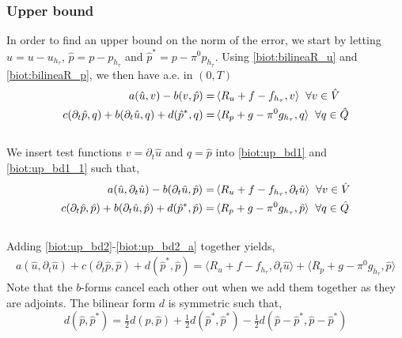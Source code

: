 \subsubsection{Upper bound} \label{biot_proof_struc}
In order to find an upper bound on the norm of the error, we start by letting $\hat{u}=u-u_{h_\tau}$, $\hat{p}=p-p_{h_\tau}$ and $\hat{p}^*=p-\pi^0p_{h_\tau}$. Using \eqref{biot:bilineaR_u} and \eqref{biot:bilineaR_p}, we then have a.e. in $(0,T)$ 
\\
\begin{align}
a(\hat{u}, v) - b(v, \hat{p}) = & \, \langle R_u + f - f_{h_\tau}, v \rangle \hspace{0.2cm} \forall v \in \hat{V} \label{biot:up_bd1}\\
c(\partial_t \hat{p}, q) + b(\partial_t \hat{u}, q) + d(\hat{p}^*, q) = & \, \langle R_p + g - \pi^0g_{h_\tau}, q \rangle \hspace{0.2cm} \forall q \in \hat{Q} \label{biot:up_bd1_1}
\end{align}
\\
We insert test functions $v=\partial_t \hat{u}$ and $q=\hat{p}$ into \eqref{biot:up_bd1} and \eqref{biot:up_bd1_1} such that,
\begin{align} \label{biot:up_bd2}
a(\hat{u}, \partial_t \hat{u}) - b(\partial_t \hat{u}, \hat{p}) = & \, \langle R_u + f - f_{h_\tau}, \partial_t \hat{u} \rangle \hspace{0.2cm} \forall v \in \hat{V} \\ \label{biot:up_bd2_a}
c(\partial_t \hat{p}, \hat{p}) + b(\partial_t \hat{u}, \hat{p}) + d(\hat{p}^*, \hat{p}) = & \, \langle R_p + g - \pi^0g_{h_\tau}, \hat{p} \rangle \hspace{0.2cm} \forall q \in \hat{Q}
\end{align}
\\
Adding \eqref{biot:up_bd2}-\eqref{biot:up_bd2_a} together yields, 
\begin{align} \label{biot:up_bd2_add}
a(\hat{u}, \partial_t \hat{u}) + c(\partial_t \hat{p}, \hat{p}) + d(\hat{p}^*, \hat{p})=  \langle R_u + f - f_{h_\tau}, \partial_t \hat{u} \rangle + \langle R_p + g - \pi^0g_{h_\tau}, \hat{p} \rangle
\end{align}
Note that the $b$-forms cancel each other out when we add them together as they are adjoints. The bilinear form $d$ is symmetric such that,
\begin{equation} \label{biot:bilinear_sym}
d(\hat{p}, \hat{p}^*) = \tfrac{1}{2}d(\hat{p}, \hat{p}) + \tfrac{1}{2}d(\hat{p}^*, \hat{p}^*) - \tfrac{1}{2}d(\hat{p}-\hat{p}^*, \hat{p}-\hat{p}^*)
\end{equation}
